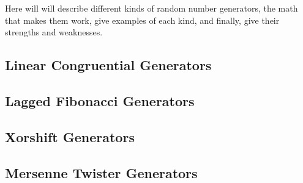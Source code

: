 Here will will describe different kinds of random number generators, the math that makes them work, give examples of each kind, and finally, give their strengths and weaknesses.

\subsection{Linear Congruential Generators}
\label{section:lcg}


\subsection{Lagged Fibonacci Generators}
\label{section:laggedfib}


\subsection{Xorshift Generators}
\label{section:xorshift}


\subsection{Mersenne Twister Generators}
\label{section:mt}

